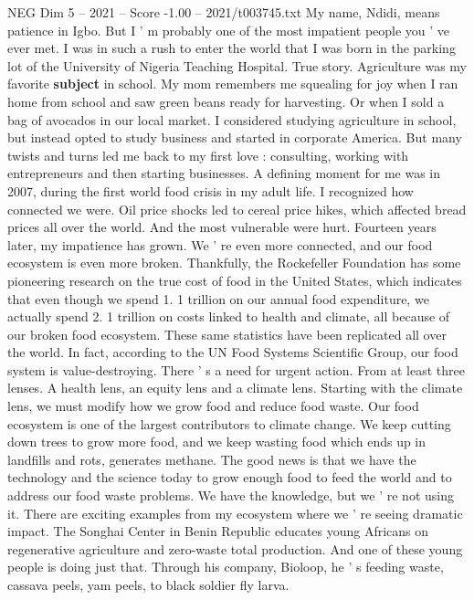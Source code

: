 \begin{textsample}{NEG Dim 5 – 2021 – Score -1.00 – 2021/t003745.txt}  \label{ex:f5_neg_009}
My name, Ndidi, means patience in Igbo.
But I ' m probably one of the most impatient people you ' ve ever met.
I was in such a rush to enter the world that I was born in the parking lot of the University of Nigeria Teaching Hospital.
True story.
Agriculture was my favorite \textbf{subject} in school.
My mom remembers me squealing for joy when I ran home from school and saw green beans ready for harvesting.
Or when I sold a bag of avocados in our local market.
I considered studying agriculture in school, but instead opted to study business and started in corporate America.
But many twists and turns led me back to my first love : consulting, working with entrepreneurs and then starting businesses.
A defining moment for me was in 2007, during the first world food crisis in my adult life.
I recognized how connected we were.
Oil price shocks led to cereal price hikes, which affected bread prices all over the world.
And the most vulnerable were hurt.
Fourteen years later, my impatience has grown.
We ' re even more connected, and our food ecosystem is even more broken.
Thankfully, the Rockefeller Foundation has some pioneering research on the true cost of food in the United States, which indicates that even though we spend 1. 1 trillion on our annual food expenditure, we actually spend 2. 1 trillion on costs linked to health and climate, all because of our broken food ecosystem.
These same statistics have been replicated all over the world.
In fact, according to the UN Food Systems Scientific Group, our food system is value-destroying.
There ' s a need for urgent action.
From at least three lenses.
A health lens, an equity lens and a climate lens.
Starting with the climate lens, we must modify how we grow food and reduce food waste.
Our food ecosystem is one of the largest contributors to climate change.
We keep cutting down trees to grow more food, and we keep wasting food which ends up in landfills and rots, generates methane.
The good news is that we have the technology and the science today to grow enough food to feed the world and to address our food waste problems.
We have the knowledge, but we ' re not using it.
There are exciting examples from my ecosystem where we ' re seeing dramatic impact.
The Songhai Center in Benin Republic educates young Africans on regenerative agriculture and zero-waste total production.
And one of these young people is doing just that.
Through his company, Bioloop, he ' s feeding waste, cassava peels, yam peels, to black soldier fly larva.

\end{textsample}
